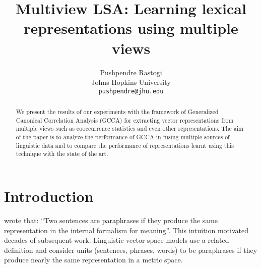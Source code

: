 \documentclass[11pt]{article}
\title{Multiview LSA: Learning lexical representations using multiple views}
\author{Pushpendre Rastogi \\
  Johns Hopkins University \\
  {\tt pushpendre@jhu.edu} 
}
\date{}
\begin{document}
\maketitle
\begin{abstract}
  We present the results  of our experiments with
  the framework of Generalized Canonical Correlation Analysis (GCCA) for extracting vector
  representations from multiple views such as cooccurrence statistics and
  even other representations. 
  The aim of the paper is to analyze the performance of GCCA in fusing
  multiple sources of linguistic 
  data and to compare the performance of representations learnt using
  this technique with  the state of the art.
\end{abstract}

\section{Introduction}
\cite{winograd1972understanding} wrote that: ``Two sentences are paraphrases if they
produce the same representation in the internal formalism for
meaning''. This intuition motivated decades of subsequent work.
Linguistic vector space models use a related
definition and consider units (sentences, phrases, words) to be
paraphrases if they produce nearly the same representation in a
metric space.
\end{document}
